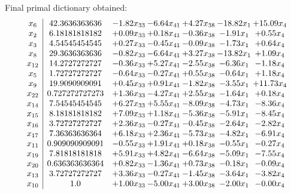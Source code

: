 \documentclass[8pt]{article}
\begin{document}
 Final primal dictionary obtained: 
\[\begin{array}{c| c c@{\hskip 2pt} c@{\hskip 2pt} c@{\hskip 2pt} c@{\hskip 2pt} c@{\hskip 2pt} }
 x_{6}   &  42.3636363636 & -1.82 x_{33} & -6.64 x_{41} & +  4.27 x_{38} & -18.82 x_{1} & + 15.09 x_{4}\\
 x_{2}   &  6.18181818182 & +  0.09 x_{33} & +  0.18 x_{41} & -0.36 x_{38} & -1.91 x_{1} & +  0.55 x_{4}\\
 x_{3}   &  4.54545454545 & +  0.27 x_{33} & -0.45 x_{41} & -0.09 x_{38} & -1.73 x_{1} & +  0.64 x_{4}\\
 x_{8}   &  29.3636363636 & -0.82 x_{33} & -6.64 x_{41} & +  3.27 x_{38} & -13.82 x_{1} & +  1.09 x_{4}\\
 x_{12}   &  14.2727272727 & -0.36 x_{33} & +  5.27 x_{41} & -2.55 x_{38} & -6.36 x_{1} & -1.18 x_{4}\\
 x_{5}   &  1.72727272727 & -0.64 x_{33} & -0.27 x_{41} & +  0.55 x_{38} & -0.64 x_{1} & +  1.18 x_{4}\\
 x_{9}   &  19.9090909091 & +  0.45 x_{33} & +  0.91 x_{41} & -1.82 x_{38} & -3.55 x_{1} & + 11.73 x_{4}\\
 x_{22}   &  0.727272727273 & +  1.36 x_{33} & -4.27 x_{41} & +  2.55 x_{38} & -1.64 x_{1} & +  0.18 x_{4}\\
 x_{14}   &  7.54545454545 & +  6.27 x_{33} & +  5.55 x_{41} & -8.09 x_{38} & -4.73 x_{1} & -8.36 x_{4}\\
 x_{15}   &  8.18181818182 & +  7.09 x_{33} & +  1.18 x_{41} & -5.36 x_{38} & -5.91 x_{1} & -8.45 x_{4}\\
 x_{16}   &  3.72727272727 & +  2.36 x_{33} & -0.27 x_{41} & -0.45 x_{38} & -2.64 x_{1} & -2.82 x_{4}\\
 x_{17}   &  7.36363636364 & +  6.18 x_{33} & +  2.36 x_{41} & -5.73 x_{38} & -4.82 x_{1} & -6.91 x_{4}\\
 x_{11}   &  0.909090909091 & -0.55 x_{33} & +  1.91 x_{41} & +  0.18 x_{38} & -0.55 x_{1} & -0.27 x_{4}\\
 x_{19}   &  7.81818181818 & +  5.91 x_{33} & +  4.82 x_{41} & -6.64 x_{38} & -5.09 x_{1} & -7.55 x_{4}\\
 x_{20}   &  0.636363636364 & +  0.82 x_{33} & -1.36 x_{41} & +  0.73 x_{38} & -0.18 x_{1} & -0.09 x_{4}\\
 x_{13}   &  3.72727272727 & +  3.36 x_{33} & -0.27 x_{41} & -1.45 x_{38} & -3.64 x_{1} & -3.82 x_{4}\\
 x_{10}   &  1.0 & +  1.00 x_{33} & -5.00 x_{41} & +  3.00 x_{38} & -2.00 x_{1} & -0.00 x_{4}\\

\end{array}\]
\end{document}
